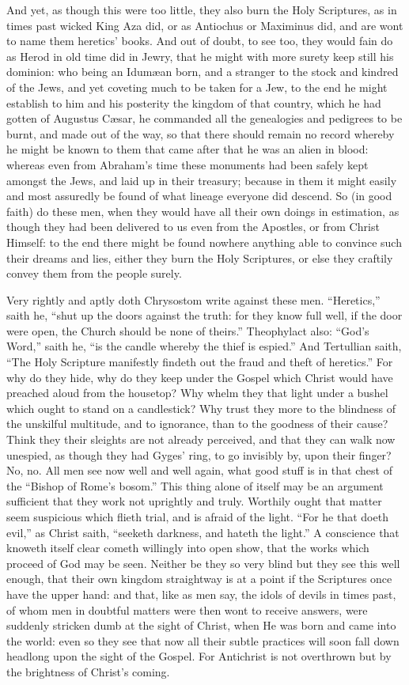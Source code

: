 And yet, as though this were too little, they also burn the Holy
Scriptures, as in times past wicked King Aza did, or as Antiochus or
Maximinus did, and are wont to name them heretics’ books.
And out of doubt, to see too, they would fain do as Herod in old time
did in Jewry, that he might with more surety keep still his dominion:
who being an Idumæan born, and a stranger to the stock and kindred
of the Jews, and yet coveting much to be taken for a Jew, to the end
he might establish to him and his posterity the kingdom of that country,
which he had gotten of Augustus Cæsar, he commanded all the genealogies
and pedigrees to be burnt, and made out of the way, so that there should
remain no record whereby he might be known to them that came after that
he was an alien
in blood: whereas even from Abraham’s time these monuments had
been safely kept amongst the Jews, and laid up in their treasury; because
in them it might easily and most assuredly be found of what lineage
everyone did descend. So (in good faith) do these men, when they
would have all their own doings in estimation, as though they had been
delivered to us even from the Apostles, or from Christ Himself: to the
end there might be found nowhere anything able to convince such their
dreams and lies, either they burn the Holy Scriptures, or else they
craftily convey them from the people surely.

Very rightly and aptly doth Chrysostom write against these men.
“Heretics,” saith he, “shut up the doors against the
truth: for they know full well, if the door were open, the Church should
be none of theirs.” Theophylact also: “God’s
Word,” saith he, “is the candle whereby the thief is espied.”
And Tertullian saith, “The Holy Scripture manifestly findeth out
the fraud and theft of heretics.” For why do they hide,
why do they keep under the Gospel which Christ would have preached aloud
from the housetop? Why whelm they that light under a bushel which
ought to stand on a candlestick? Why trust they more to the blindness
of the unskilful multitude, and to ignorance, than to
the goodness of their cause? Think they their sleights are not
already perceived, and that they can walk now unespied, as though they
had Gyges’ ring, to go invisibly by, upon their finger?
No, no. All men see now well and well again, what good stuff is
in that chest of the “Bishop of Rome’s bosom.”
This thing alone of itself may be an argument sufficient that they work
not uprightly and truly. Worthily ought that matter seem suspicious
which flieth trial, and is afraid of the light. “For he
that doeth evil,” as Christ saith, “seeketh darkness, and
hateth the light.” A conscience that knoweth itself clear
cometh willingly into open show, that the works which proceed of God
may be seen. Neither be they so very blind but they see this well
enough, that their own kingdom straightway is at a point if the Scriptures
once have the upper hand: and that, like as men say, the idols of devils
in times past, of whom men in doubtful matters were then wont to receive
answers, were suddenly stricken dumb at the sight of Christ, when He
was born and came into the world: even so they see that now all their
subtle practices will soon fall down headlong upon the sight of the
Gospel. For Antichrist is not overthrown but by the brightness
of Christ’s coming.

